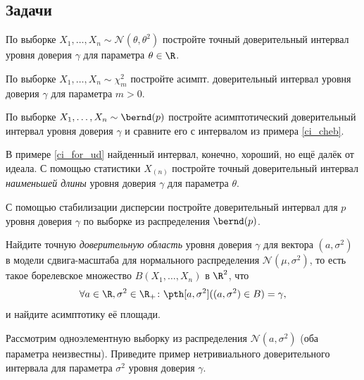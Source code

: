 \subsection*{Задачи}

\begin{problem}
	По выборке $X_1, \ldots, X_n \sim \mathcal{N}(\theta, \theta^2)$ постройте точный доверительный интервал уровня доверия $\gamma$ для параметра $\theta \in \R$.
\end{problem}

\begin{problem}
	По выборке $X_1, \ldots, X_n \sim \chi^2_m$ постройте асимпт. доверительный интервал уровня доверия $\gamma$ для параметра $m > 0$.
\end{problem}

\begin{problem}
    По выборке $X_1, \ldots, X_n \sim \bernd(p)$ постройте асимптотический доверительный интервал уровня доверия $\gamma$ и сравните его с интервалом из примера \ref{ci_cheb}.
\end{problem}

\begin{problem}
	В примере \ref{ci_for_ud} найденный интервал, конечно, хороший, но ещё далёк от идеала. С помощью статистики $X_{(n)}$ постройте точный доверительный интервал \textit{наименьшей длины} уровня доверия $\gamma$ для параметра $\theta$.
\end{problem}

\begin{problem}
	С помощью стабилизации дисперсии постройте доверительный интервал для $p$ уровня доверия $\gamma$ по выборке из распределения $\bernd(p)$.
\end{problem}

\begin{problem}
    Найдите точную \textit{доверительную область} уровня доверия $\gamma$ для вектора $(a, \sigma^2)$ в модели сдвига-масштаба для нормального распределения $\mathcal{N}(\mu, \sigma^2)$, то есть такое борелевское множество $B(X_1, \ldots, X_n)$ в $\R^2$, что
    \[
    \forall a \in \R, \sigma^2 \in \R_{+} \colon \pth[a,\sigma^2]((a, \sigma^2) \in B) = \gamma,
    \]
    и найдите асимптотику её площади.
\end{problem}

\begin{problem}
    Рассмотрим одноэлементную выборку из распределения $\mathcal{N}(a, \sigma^2)$ (оба параметра неизвестны). Приведите пример нетривиального доверительного интервала для параметра $\sigma^2$ уровня доверия $\gamma$. 
\end{problem}



